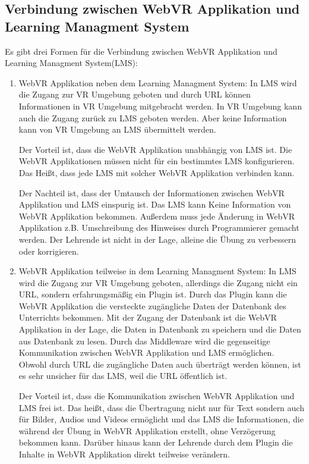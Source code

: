  \subsection{Verbindung zwischen WebVR Applikation und Learning Managment System}
 Es gibt drei Formen für die Verbindung zwischen WebVR Applikation und Learning Managment System(LMS):
 \begin{enumerate}
   \item WebVR Applikation neben dem Learning Managment System:
     \subitem In LMS wird die Zugang zur VR Umgebung geboten und durch URL können Informationen in VR Umgebung mitgebracht werden. In VR Umgebung kann auch die Zugang zurück zu LMS geboten werden. Aber keine Information kann von VR Umgebung an LMS übermittelt werden.
     
     Der Vorteil ist, dass die WebVR Applikation unabhängig von LMS ist. Die WebVR Applikationen müssen nicht für ein bestimmtes LMS konfigurieren. Das Heißt, dass jede LMS mit solcher WebVR Applikation verbinden kann.
     
     Der Nachteil ist, dass der Umtausch der Informationen zwischen WebVR Applikation und LMS einspurig ist. Das LMS kann Keine Information von WebVR Applikation bekommen. Außerdem muss jede Änderung in WebVR Applikation z.B. Umschreibung des Hinweises durch Programmierer gemacht werden. Der Lehrende ist nicht in der Lage, alleine die Übung zu verbessern oder korrigieren.
     
   \item WebVR Applikation teilweise in dem Learning Managment System:
     \subitem In LMS wird die Zugang zur VR Umgebung geboten, allerdings die Zugang nicht ein URL, sondern erfahrungsmäßig ein Plugin ist. Durch das Plugin kann die WebVR Applikation die versteckte zugängliche Daten der Datenbank des Unterrichts bekommen. Mit der Zugang der Datenbank ist die WebVR Applikation in der Lage, die Daten in Datenbank zu speichern und die Daten aus Datenbank zu lesen. Durch das Middleware wird die gegenseitige Kommunikation zwischen WebVR Applikation und LMS ermöglichen. Obwohl durch URL die zugängliche Daten auch überträgt werden können, ist es sehr unsicher für das LMS, weil die URL öffentlich ist.
     
     Der Vorteil ist, dass die Kommunikation zwischen WebVR Applikation und LMS frei ist. Das heißt, dass die Übertragung nicht nur für Text sondern auch für Bilder, Audios und Videos ermöglicht und das LMS die Informationen, die während der Übung in WebVR Applikation erstellt, ohne Verzögerung bekommen kann. Darüber hinaus kann der Lehrende durch dem Plugin die Inhalte in WebVR Applikation direkt teilweise verändern.
     

\end{enumerate}
